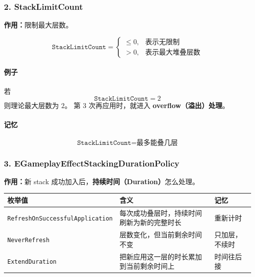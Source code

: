 \documentclass[CJKmath=true,10pt]{MyBook}
\begin{document}
\subsubsection{2. StackLimitCount}

\textbf{作用：}限制最大层数。

\[
\texttt{StackLimitCount} =
\begin{cases}
	\le 0, & \text{表示无限制} \\
	> 0, & \text{表示最大堆叠层数}
\end{cases}
\]

\paragraph{例子}
若
\[
\texttt{StackLimitCount} = 2
\]
则理论最大层数为 $2$。  
第 $3$ 次再应用时，就进入 \textbf{overflow（溢出）处理}。

\paragraph{记忆}
\[
\boxed{
	\texttt{StackLimitCount} = \text{最多能叠几层}
}
\]

\subsubsection{3. EGameplayEffectStackingDurationPolicy}

\textbf{作用：}新 stack 成功加入后，\textbf{持续时间（Duration）}怎么处理。

\begin{longtable}{@{}p{}p{}p{}@{}}
	\toprule
	\textbf{枚举值} & \textbf{含义} & \textbf{记忆} \\
	\midrule
	\endhead
	
	\texttt{RefreshOnSuccessfulApplication}
	&
	每次成功叠层时，持续时间刷新为新的完整时长
	&
	重新计时
	\\
	
	\texttt{NeverRefresh}
	&
	层数变化，但当前剩余时间不变
	&
	只加层，不续时
	\\
	
	\texttt{ExtendDuration}
	&
	把新应用这一层的时长累加到当前剩余时间上
	&
	时间往后接
	\\
	
	\bottomrule
\end{longtable}
\end{document}
